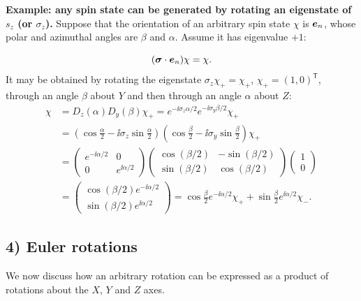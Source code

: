 \textbf{Example: any spin state can be generated by rotating an eigenstate of $s_z$ (or $\sigma_z$).}
Suppose that the orientation of an arbitrary spin state $\chi$ is $\bm{e}_n$, whose polar and azimuthal angles are $\beta$ and $\alpha$. Assume it has eigenvalue $+1$:

\begin{equation}
(\bm{\sigma}\cdot\bm{e}_n)\chi=\chi.
\end{equation}
It may be obtained by rotating the eigenstate $\sigma_z\chi_+=\chi_+$, $\chi_+=(1,0)^{\mathsf T}$, through an angle $\beta$ about $Y$ and then through an angle $\alpha$ about $Z$:
\begin{equation}\begin{aligned}
\chi&=D_z(\alpha)D_y(\beta)\chi_+
=e^{-\ii\sigma_z\alpha/2}e^{-\ii\sigma_y\beta/2}\chi_+\\
&=\left(\cos\frac\alpha2-\ii\sigma_z\sin\frac\alpha2\right)
\left(\cos\frac\beta2-\ii\sigma_y\sin\frac\beta2\right)\chi_+\\
&=\begin{pmatrix}e^{-\ii\alpha/2}&0\\0&e^{\ii\alpha/2}\end{pmatrix}
\begin{pmatrix}\cos(\beta/2)&-\sin(\beta/2)\\\sin(\beta/2)&\cos(\beta/2)\end{pmatrix}\begin{pmatrix}1\\0\end{pmatrix}\\
&=\begin{pmatrix}\cos(\beta/2)e^{-\ii\alpha/2}\\\sin(\beta/2)e^{\ii\alpha/2}\end{pmatrix}
=\cos\frac\beta2e^{-\ii\alpha/2}\chi_+
+\sin\frac\beta2e^{\ii\alpha/2}\chi_-.
\end{aligned}\end{equation}

\subsection*{4) Euler rotations}
We now discuss how an arbitrary rotation can be expressed as a product of rotations about the $X$, $Y$ and $Z$ axes.

